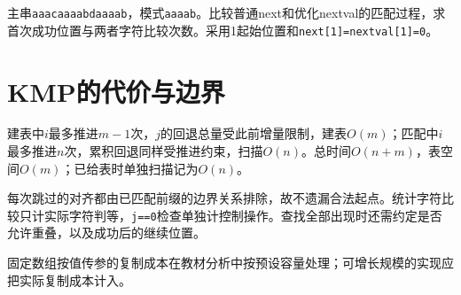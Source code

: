 主串\texttt{aaacaaaabdaaaab}，模式\texttt{aaaab}。比较普通next和优化nextval的匹配过程，求首次成功位置与两者字符比较次数。采用1起始位置和\texttt{next[\allowbreak{}1]\allowbreak{}=\allowbreak{}nextval[\allowbreak{}1]\allowbreak{}=\allowbreak{}0}。

\section{KMP的代价与边界}\label{DS04-analysis}

建表中\(i\)最多推进\(m-1\)次，\(j\)的回退总量受此前增量限制，建表\(O(m)\)；匹配中\(i\)最多推进\(n\)次，累积回退同样受推进约束，扫描\(O(n)\)。总时间\(O(n+m)\)，表空间\(O(m)\)；已给表时单独扫描记为\(O(n)\)。

每次跳过的对齐都由已匹配前缀的边界关系排除，故不遗漏合法起点。统计字符比较只计实际字符判等，\texttt{j=\allowbreak{}=\allowbreak{}0}检查单独计控制操作。查找全部出现时还需约定是否允许重叠，以及成功后的继续位置。

固定数组按值传参的复制成本在教材分析中按预设容量处理；可增长规模的实现应把实际复制成本计入。
